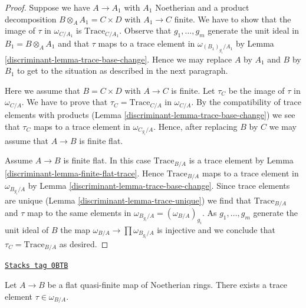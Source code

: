 \begin{proof}

Suppose we have $A \to A_1$ with $A_1$ Noetherian and a product
decomposition $B \otimes_A A_1 = C \times D$ with $A_1 \to C$ finite.
We have to show that the image of $\tau$ in $\omega_{C/A_1}$ is
$\text{Trace}_{C/A_1}$. Observe that $g_1, \ldots, g_m$
generate the unit ideal in $B_1 = B \otimes_A A_1$ and that
$\tau$ maps to a trace element in $\omega_{(B_1)_{g_i}/A_1}$
by Lemma \ref{discriminant-lemma-trace-base-change}. Hence we may replace
$A$ by $A_1$ and $B$ by $B_1$ to get to the situation as described
in the next paragraph.

\medskip\noindent
Here we assume that $B = C \times D$ with $A \to C$ is finite.
Let $\tau_C$ be the image of $\tau$ in $\omega_{C/A}$.
We have to prove that $\tau_C = \text{Trace}_{C/A}$ in $\omega_{C/A}$.
By the compatibility of trace elements with products
(Lemma \ref{discriminant-lemma-trace-base-change})
we see that $\tau_C$ maps to a trace element in $\omega_{C_{g_i}/A}$.
Hence, after replacing $B$ by $C$ we may assume that $A \to B$
is finite flat.

\medskip\noindent
Assume $A \to B$ is finite flat. In this case $\text{Trace}_{B/A}$
is a trace element by Lemma \ref{discriminant-lemma-finite-flat-trace}.
Hence $\text{Trace}_{B/A}$ maps to a trace element in
$\omega_{B_{g_i}/A}$ by Lemma \ref{discriminant-lemma-trace-base-change}.
Since trace elements are unique (Lemma \ref{discriminant-lemma-trace-unique})
we find that $\text{Trace}_{B/A}$ and $\tau$ map
to the same elements in $\omega_{B_{g_i}/A} = (\omega_{B/A})_{g_i}$.
As $g_1, \ldots, g_m$ generate the unit ideal of $B$ the map
$\omega_{B/A} \to \prod \omega_{B_{g_i}/A}$ is injective
and we conclude that $\tau_C = \text{Trace}_{B/A}$ as desired.
\end{proof}

\begin{lemma}
\label{discriminant-lemma-dualizing-tau}
\href{https://stacks.math.columbia.edu/tag/0BTB}{\texttt{Stacks tag 0BTB}}

Let $A \to B$ be a flat quasi-finite map of Noetherian rings.
There exists a trace element $\tau \in \omega_{B/A}$.
\end{lemma}

